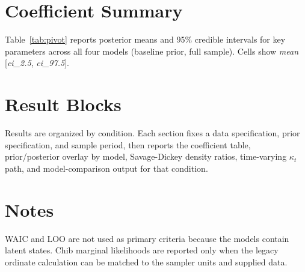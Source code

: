 \documentclass[11pt]{article}
\begin{document}
\section{Coefficient Summary}
Table~\ref{tab:pivot} reports posterior means and 95\% credible intervals for
key parameters across all four models (baseline prior, full sample).
Cells show \textit{mean} [\textit{ci\_2.5}, \textit{ci\_97.5}].

\begin{table}[H]
\centering
\caption{Posterior means and 95\% credible intervals by model}
\label{tab:pivot}
\scriptsize
\resizebox{\textwidth}{!}{}
\end{table}

\section{Result Blocks}
Results are organized by condition. Each section fixes a data specification,
prior specification, and sample period, then reports the coefficient table,
prior/posterior overlay by model, Savage-Dickey density ratios, time-varying
\(\kappa_t\) path, and model-comparison output for that condition.


\section{Notes}
WAIC and LOO are not used as primary criteria because the models contain
latent states. Chib marginal likelihoods are reported only when the legacy
ordinate calculation can be matched to the sampler units and supplied data.
\end{document}
